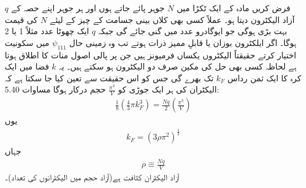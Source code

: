 \documentclass[leqno, b5paper]{khalid-urdu-book}
\begin{document}
	فرض کریں مادہ کے ایک ٹکڑا میں $N$ جوہر پائے جاتے ہوں اور ہر جوہر اپنے حصہ کے $q$ آزاد الیکٹرون دیتا ہو۔ عملاً کسی بھی کلاں بینی جسامت کے چیز کے لیئے $N$ کی قیمت بہت بڑی ہوگی جو ایوگادرو عدد میں گنی جائے گی جبکہ $q$ ایک چھوٹا عدد مثلاً 1 یا 2 ہوگا۔ اگر ایلکٹرون بوزان یا قابلِ ممیز ذرات ہوتے تب وہ زمینی حال $\psi_{111}$ میں سکونیت اختیار کرتے حقیقتاً الیکٹروں یکساں فرمیونز ہیں جن پر پالی اصول منات کا اطلاق ہوتا ہے لحاظہ کسی بھی حل کی مکین صرف دو الیکٹرون ہو سکتے ہیں۔ یہ $k$ فضا میں ایک کرہ کا ایک ثمن رداس $k_F$ تک بھرے گی جس کو اس حقیقت سے تعین کیا جا سکتا ہے کہ الیکٹران کی ہر ایک جوڑی کو \(\frac{\pi^{3}}{V}\) حجم درکار ہوگا مساوات  \num{5.40}: 
	\begin{align*}
		\frac{1}{8}(\frac{4}{3} \pi k^{3}_F) =  \frac{Nq}{2}(\frac{\pi^3}{V})
	\end{align*}
یوں
\begin{align}
	k_F =(3\rho\pi^{2})^{\frac{1}{3}}
\end{align}
جہاں
\begin{align}
	\rho \equiv \frac{Nq}{V}
\end{align}
آزاد الیکٹران کثافت ہے(آزاد حجم میں الیکٹرانوں کی تعداد)۔
\end{document}
